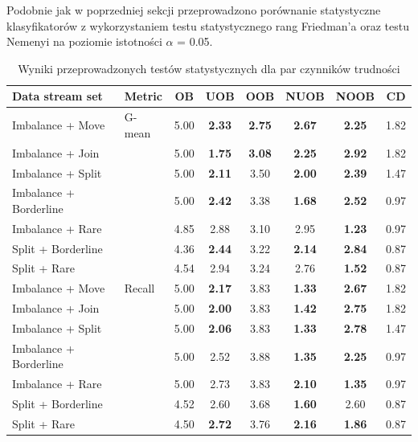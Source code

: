 Podobnie jak w poprzedniej sekcji przeprowadzono porównanie statystyczne klasyfikatorów z wykorzystaniem testu statystycznego rang Friedman'a oraz testu Nemenyi na poziomie istotności $\alpha$ = 0.05.

\newpage

\begin{table}[ht]
\centering\small%
\setlength{\tabcolsep}{10pt} 
\renewcommand{\arraystretch}{1.5} 
\begin{tabular}{l l c c c c c c}
\toprule
Data stream set & Metric & OB & UOB & OOB & NUOB & NOOB & CD \\
\midrule
Imbalance + Move & G-mean & 5.00 & \textbf{2.33} & \textbf{2.75} & \textbf{2.67} & \textbf{2.25} & 1.82 \\
Imbalance + Join  & & 5.00 & \textbf{1.75} & \textbf{3.08} & \textbf{2.25} & \textbf{2.92} & 1.82 \\
Imbalance + Split  & & 5.00 & \textbf{2.11} & 3.50 & \textbf{2.00} & \textbf{2.39} & 1.47 \\
Imbalance + Borderline  & & 5.00 & \textbf{2.42} & 3.38 & \textbf{1.68} & \textbf{2.52} & 0.97 \\
Imbalance + Rare  & & 4.85 & 2.88 & 3.10 & 2.95 & \textbf{1.23} & 0.97 \\
Split + Borderline  & & 4.36 & \textbf{2.44} & 3.22 & \textbf{2.14} & \textbf{2.84} & 0.87 \\
Split + Rare  & & 4.54 & 2.94 & 3.24 & 2.76 & \textbf{1.52} & 0.87 \\
Imbalance + Move & Recall & 5.00 & \textbf{2.17} & 3.83 & \textbf{1.33} & \textbf{2.67} & 1.82 \\
Imbalance + Join  & & 5.00 & \textbf{2.00} & 3.83 & \textbf{1.42} & \textbf{2.75} & 1.82 \\
Imbalance + Split  & & 5.00 & \textbf{2.06} & 3.83 & \textbf{1.33} & \textbf{2.78} & 1.47 \\
Imbalance + Borderline  & & 5.00 & 2.52 & 3.88 & \textbf{1.35} & \textbf{2.25} & 0.97 \\
Imbalance + Rare  & & 5.00 & 2.73 & 3.83 & \textbf{2.10} & \textbf{1.35} & 0.97 \\
Split + Borderline  & & 4.52 & 2.60 & 3.68 & \textbf{1.60} & 2.60 & 0.87 \\
Split + Rare  & & 4.50 & \textbf{2.72} & 3.76 & \textbf{2.16} & \textbf{1.86} & 0.87 \\
\bottomrule
\end{tabular}
\caption{Wyniki przeprowadzonych testów statystycznych dla par czynników trudności}\label{Tab:DoubleDriftFriedman}
\end{table}

